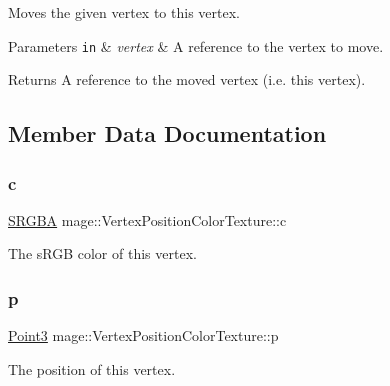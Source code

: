 Moves the given vertex to this vertex.


\begin{DoxyParams}[1]{Parameters}
\mbox{\tt in}  & {\em vertex} & A reference to the vertex to move. \\
\hline
\end{DoxyParams}
\begin{DoxyReturn}{Returns}
A reference to the moved vertex (i.\+e. this vertex). 
\end{DoxyReturn}


\subsection{Member Data Documentation}
\hypertarget{structmage_1_1_vertex_position_color_texture_a74c470e36536a800657daef6de1e8e9f}{}\label{structmage_1_1_vertex_position_color_texture_a74c470e36536a800657daef6de1e8e9f} 
\subsubsection{\texorpdfstring{c}{c}}
{\footnotesize\ttfamily \hyperlink{structmage_1_1_s_r_g_b_a}{S\+R\+G\+BA} mage\+::\+Vertex\+Position\+Color\+Texture\+::c}

The s\+R\+GB color of this vertex. \hypertarget{structmage_1_1_vertex_position_color_texture_a145c2e2fce90b07252b778b46e31ea24}{}\label{structmage_1_1_vertex_position_color_texture_a145c2e2fce90b07252b778b46e31ea24} 
\subsubsection{\texorpdfstring{p}{p}}
{\footnotesize\ttfamily \hyperlink{structmage_1_1_point3}{Point3} mage\+::\+Vertex\+Position\+Color\+Texture\+::p}

The position of this vertex. \hypertarget{structmage_1_1_vertex_position_color_texture_a19df72ffa15fae0b389b9f66d7b8f3bd}{}\label{structmage_1_1_vertex_position_color_texture_a19df72ffa15fae0b389b9f66d7b8f3bd} 
